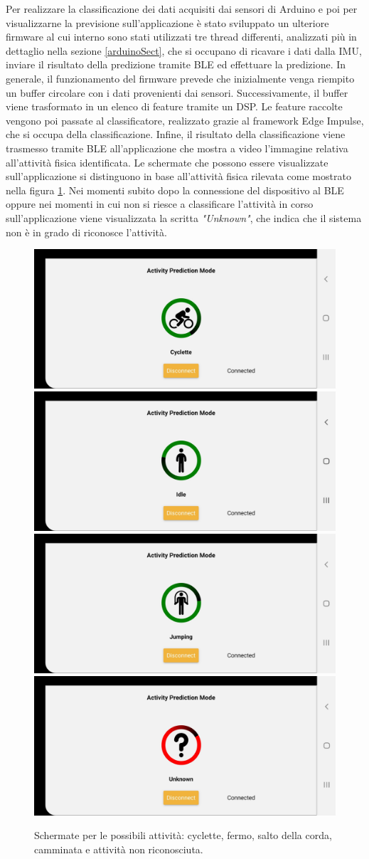 Per realizzare la classificazione dei dati acquisiti dai sensori di Arduino e poi per visualizzarne la previsione sull'applicazione è stato sviluppato un ulteriore firmware al cui interno sono stati utilizzati tre thread differenti, analizzati più in dettaglio nella sezione \ref{arduinoSect}, che si occupano di ricavare i dati dalla IMU, inviare il risultato della predizione tramite BLE ed effettuare la predizione. In generale, il funzionamento del firmware prevede che inizialmente venga riempito un buffer circolare con i dati provenienti dai sensori. Successivamente, il buffer viene trasformato in un elenco di feature  tramite un DSP. Le feature raccolte vengono poi passate al classificatore, realizzato grazie al framework Edge Impulse, che si occupa della classificazione. Infine, il risultato della classificazione viene trasmesso tramite BLE all'applicazione che mostra a video l'immagine relativa all'attività fisica identificata. Le schermate che possono essere visualizzate sull'applicazione si distinguono in base all'attività fisica rilevata come mostrato nella figura \ref{fig:attivitafisica}. Nei momenti subito dopo la connessione del dispositivo al BLE oppure nei momenti in cui non si riesce a classificare l'attività in corso sull'applicazione viene visualizzata la scritta \textit{"Unknown"}, che indica che il sistema non è in grado di riconosce l'attività.
\begin{figure}[tbh]
	\centering
	\includegraphics[width=0.4\linewidth]{./ImageFiles/cyclette}
	\includegraphics[width=0.4\linewidth]{./ImageFiles/idle}
	\includegraphics[width=0.4\linewidth]{./ImageFiles/jumping}
	\includegraphics[width=0.4\linewidth]{./ImageFiles/unknown}
	\caption{Schermate per le possibili attività: cyclette, fermo, salto della corda, camminata e attività non riconosciuta.}
	\label{fig:attivitafisica}
\end{figure}

